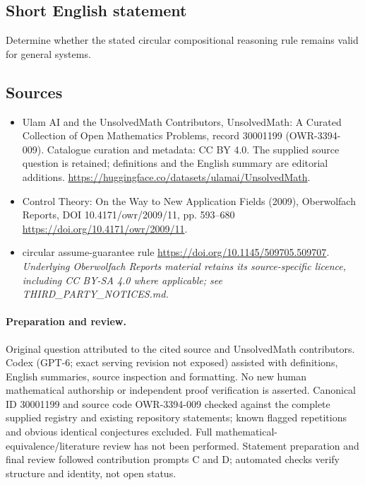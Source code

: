 \documentclass[11pt]{article}
\begin{document}
\subsection{Short English statement}
Determine whether the stated circular compositional reasoning rule remains valid for general systems.
\subsection{Sources}
\begin{itemize}
\item[\hypertarget{source:30001199:1}{S1}] Ulam AI and the UnsolvedMath Contributors, UnsolvedMath: A Curated Collection of Open Mathematics Problems, record 30001199 (OWR-3394-009). Catalogue curation and metadata: CC BY 4.0. The supplied source question is retained; definitions and the English summary are editorial additions.
\url{https://huggingface.co/datasets/ulamai/UnsolvedMath}.
\item[\hypertarget{source:30001199:2}{S2}] Control Theory: On the Way to New Application Fields (2009), Oberwolfach Reports, DOI 10.4171/owr/2009/11, pp. 593--680
\url{https://doi.org/10.4171/owr/2009/11}.
\item[\hypertarget{source:30001199:3}{S3}] circular assume-guarantee rule
\url{https://doi.org/10.1145/509705.509707}.
\textit{Underlying Oberwolfach Reports material retains its source-specific licence, including CC BY-SA 4.0 where applicable; see THIRD\_PARTY\_NOTICES.md.}
\end{itemize}
\paragraph{Preparation and review.}
Original question attributed to the cited source and UnsolvedMath contributors. Codex (GPT-6; exact serving revision not exposed) assisted with definitions, English summaries, source inspection and formatting. No new human mathematical authorship or independent proof verification is asserted. Canonical ID 30001199 and source code OWR-3394-009 checked against the complete supplied registry and existing repository statements; known flagged repetitions and obvious identical conjectures excluded. Full mathematical-equivalence/literature review has not been performed. Statement preparation and final review followed contribution prompts C and D; automated checks verify structure and identity, not open status.
\label{end:30001199}
\end{document}
